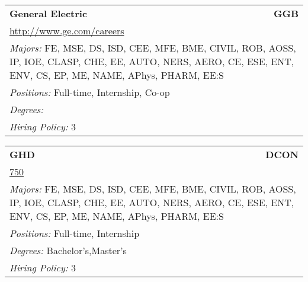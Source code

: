 \documentclass[twoside]{article}
\begin{document}
\begin{center}
\begin{multicols}{3}
\begin{FlushLeft}
\begin{minipage}{.9\columnwidth}
\end{minipage}
 
\begin{minipage}{.9\columnwidth}\begin{tabularx}{.95\columnwidth}{Xr}
                 {\Large\bf General Electric} & {\Large\bf GGB}\\
    \multicolumn{2}{p{.95\columnwidth}}{\url{http://www.ge.com/careers}}\\
    \multicolumn{2}{p{.95\columnwidth}}{\emph{Majors:} FE, MSE, DS, ISD, CEE, MFE, BME, CIVIL, ROB, AOSS, IP, IOE, CLASP, CHE, EE, AUTO, NERS, AERO, CE, ESE, ENT, ENV, CS, EP, ME, NAME, APhys, PHARM, EE:S}\\
    \multicolumn{2}{p{.95\columnwidth}}{\emph{Positions:} Full-time, Internship, Co-op}\\
    \multicolumn{2}{p{.95\columnwidth}}{\emph{Degrees:} }\\
    \multicolumn{2}{p{.95\columnwidth}}{\emph{Hiring Policy:} 3}\\
    \end{tabularx}
    
\end{minipage}
 
\begin{minipage}{.9\columnwidth}\begin{tabularx}{.95\columnwidth}{Xr}
                 {\Large\bf GHD} & {\Large\bf DCON}\\
    \multicolumn{2}{p{.95\columnwidth}}{\url{750}}\\
    \multicolumn{2}{p{.95\columnwidth}}{\emph{Majors:} FE, MSE, DS, ISD, CEE, MFE, BME, CIVIL, ROB, AOSS, IP, IOE, CLASP, CHE, EE, AUTO, NERS, AERO, CE, ESE, ENT, ENV, CS, EP, ME, NAME, APhys, PHARM, EE:S}\\
    \multicolumn{2}{p{.95\columnwidth}}{\emph{Positions:} Full-time, Internship}\\
    \multicolumn{2}{p{.95\columnwidth}}{\emph{Degrees:} Bachelor's,Master's}\\
    \multicolumn{2}{p{.95\columnwidth}}{\emph{Hiring Policy:} 3}\\
    \end{tabularx}
    
\end{minipage}
 

\end{FlushLeft}
\end{multicols}
\end{center}
\end{document}
